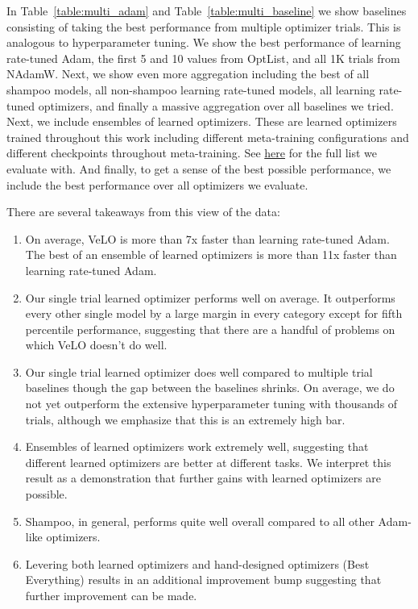 \documentclass[11pt]{article}
\begin{document}
In Table~\ref{table:multi_adam} and Table~\ref{table:multi_baseline} we show baselines consisting of taking the best performance from multiple optimizer trials.
This is analogous to hyperparameter tuning.
We show the best performance of learning rate-tuned Adam, the first 5 and 10 values from OptList, and all 1K trials from NAdamW.
Next, we show even more aggregation including the best of all shampoo models, all non-shampoo learning rate-tuned models, all learning rate-tuned optimizers, and finally a massive aggregation over all baselines we tried.
Next, we include ensembles of learned optimizers.
These are learned optimizers trained throughout this work including different meta-training configurations and different checkpoints throughout meta-training.
See \href{https://github.com/google/learned_optimization/blob/b1d8267c5e513a4112e7422b98bacc16e1f0e844/learned_optimization/research/general_lopt/pretrained_optimizers.py#L32}{here} for the full list we evaluate with. 
And finally, to get a sense of the best possible performance, we include the best performance over all optimizers we evaluate.


There are several takeaways from this view of the data: 
\begin{enumerate}
    \item On average, VeLO is more than 7x faster than learning rate-tuned Adam. The best of an ensemble of learned optimizers is more than 11x faster than learning rate-tuned Adam.
    \item Our single trial learned optimizer performs well on average. It outperforms every other single model by a large margin in every category except for fifth percentile performance, suggesting that there are a handful of problems on which VeLO doesn't do well.
    \item Our single trial learned optimizer does well compared to multiple trial baselines though the gap between the baselines shrinks. On average, we do not yet outperform the extensive hyperparameter tuning with thousands of trials, although we emphasize that this is an extremely high bar. 
    \item Ensembles of learned optimizers work extremely well, suggesting that different learned optimizers are better at different tasks. We interpret this result as a demonstration that further gains with learned optimizers are possible.
    \item Shampoo, in general, performs quite well overall compared to all other Adam-like optimizers.
    \item Levering both learned optimizers and hand-designed optimizers (Best Everything) results in an additional improvement bump suggesting that further improvement can be made.
\end{enumerate}
\end{document}
